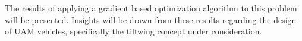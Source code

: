 
The results of applying a gradient based optimization algorithm to this problem will be presented.
Insights will be drawn from these results regarding the design of UAM vehicles, specifically the tiltwing concept under consideration. 
